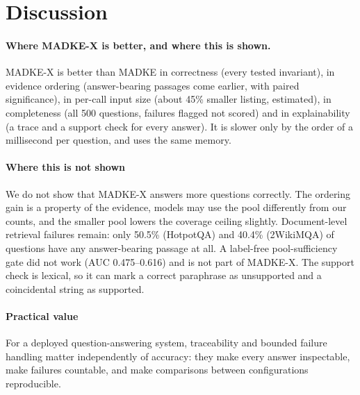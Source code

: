 \section{Discussion}
\label{sec:discussion}

\paragraph{Where MADKE-X is better, and where this is shown.} MADKE-X is better than MADKE in correctness (every tested invariant), in evidence ordering (answer-bearing passages come earlier, with paired significance), in per-call input size (about 45\% smaller listing, estimated), in completeness (all 500 questions, failures flagged not scored) and in explainability (a trace and a support check for every answer). It is slower only by the order of a millisecond per question, and uses the same memory.

\paragraph{Where this is not shown} We do not show that MADKE-X answers more questions correctly. The ordering gain is a property of the evidence, models may use the pool differently from our counts, and the smaller pool lowers the coverage ceiling slightly. Document-level retrieval failures remain: only 50.5\% (HotpotQA) and 40.4\% (2WikiMQA) of questions have any answer-bearing passage at all. A label-free pool-sufficiency gate did not work (AUC 0.475--0.616) and is not part of MADKE-X. The support check is lexical, so it can mark a correct paraphrase as unsupported and a coincidental string as supported.

\paragraph{Practical value} For a deployed question-answering system, traceability and bounded failure handling matter independently of accuracy: they make every answer inspectable, make failures countable, and make comparisons between configurations reproducible.
